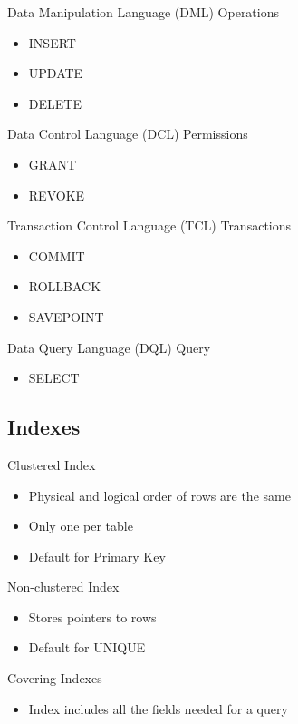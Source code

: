 \documentclass[11pt,journal,compsoc]{IEEEtran}
\begin{document}
Data Manipulation Language (DML) Operations

\begin{itemize}
    \item INSERT
    \item UPDATE
    \item DELETE
\end{itemize}

Data Control Language (DCL) Permissions

\begin{itemize}
    \item GRANT
    \item REVOKE
\end{itemize}

Transaction Control Language (TCL) Transactions

\begin{itemize}
    \item COMMIT
    \item ROLLBACK
    \item SAVEPOINT
\end{itemize}

Data Query Language (DQL) Query

\begin{itemize}
    \item SELECT
\end{itemize}


\subsection{Indexes}

Clustered Index

\begin{itemize}
    \item Physical and logical order of rows are the same
    \item Only one per table
    \item Default for Primary Key
\end{itemize}

Non-clustered Index

\begin{itemize}
    \item Stores pointers to rows
    \item Default for UNIQUE
\end{itemize}

Covering Indexes

\begin{itemize}
    \item Index includes all the fields needed for a query
\end{itemize}
\end{document}
